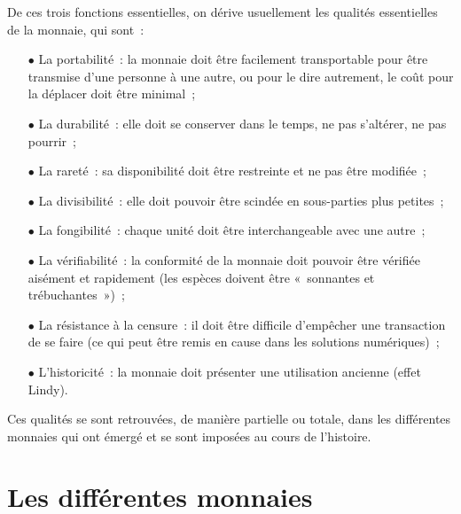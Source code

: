 De ces trois fonctions essentielles, on dérive usuellement les qualités essentielles de la monnaie, qui sont~: 

\begin{itemize}
\item[$\bullet$] La portabilité~: la monnaie doit être facilement transportable pour être transmise d'une personne à une autre, ou pour le dire autrement, le coût pour la déplacer doit être minimal~;
\item[$\bullet$] La durabilité~: elle doit se conserver dans le temps, ne pas s'altérer, ne pas pourrir~;
\item[$\bullet$] La rareté~: sa disponibilité doit être restreinte et ne pas être modifiée~;
\item[$\bullet$] La divisibilité~: elle doit pouvoir être scindée en sous-parties plus petites~;
\item[$\bullet$] La fongibilité~: chaque unité doit être interchangeable avec une autre~;
\item[$\bullet$] La vérifiabilité~: la conformité de la monnaie doit pouvoir être vérifiée aisément et rapidement (les espèces doivent être «~sonnantes et trébuchantes~»)~;
\item[$\bullet$] La résistance à la censure~: il doit être difficile d'empêcher une transaction de se faire (ce qui peut être remis en cause dans les solutions numériques)~;
\item[$\bullet$] L'historicité~: la monnaie doit présenter une utilisation ancienne (effet Lindy).
\end{itemize}

Ces qualités se sont retrouvées, de manière partielle ou totale, dans les différentes monnaies qui ont émergé et se sont imposées au cours de l'histoire.

\section*{Les différentes monnaies}

